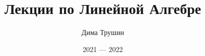 \documentclass{article}
\begin{document}
\title{Лекции по Линейной Алгебре}
\author{Дима Трушин}
\date{2021 --- 2022}
	
\maketitle
\tableofcontents

















\end{document}
